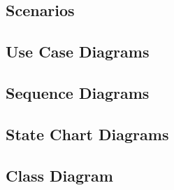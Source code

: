 \subsection{Scenarios}
\label{sect:uml:scenarios}


\subsection{Use Case Diagrams}
\label{sect:uml:usecases}


\subsection{Sequence Diagrams}
\label{sect:uml:sequences}


\subsection{State Chart Diagrams}
\label{sect:uml:statechart}


\subsection{Class Diagram}
\label{sect:uml:class}
